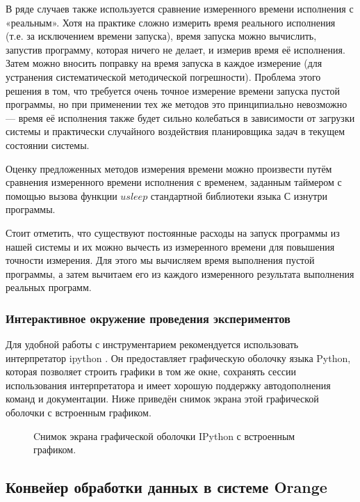 В ряде случаев также используется сравнение измеренного времени исполнения с «реальным». Хотя на практике сложно измерить время реального исполнения (т.е. за исключением времени запуска), время запуска можно вычислить, запустив программу, которая ничего не делает, и измерив время её исполнения. Затем можно вносить поправку на время запуска в каждое измерение (для устранения систематической методической погрешности). Проблема этого решения в том, что требуется очень точное измерение времени запуска пустой программы, но при применении тех же методов это принципиально невозможно --- время её исполнения также будет сильно колебаться в зависимости от загрузки системы и практически случайного воздействия планировщика задач в текущем состоянии системы.

Оценку предложенных методов измерения времени можно произвести путём сравнения измеренного времени исполнения с временем, заданным таймером с помощью вызова функции $usleep$ стандартной библиотеки языка {С} изнутри программы.

Стоит отметить, что существуют постоянные расходы на запуск программы из нашей системы и их можно вычесть из измеренного времени для повышения точности измерения. Для этого мы вычисляем время выполнения пустой программы, а затем вычитаем его из каждого измеренного результата выполнения реальных программ.

\subsubsection{Интерактивное окружение проведения экспериментов}
Для удобной работы с инструментарием рекомендуется использовать интерпретатор ipython \cite{ipython}. Он предоставляет графическую оболочку языка {Python}, которая позволяет строить графики в том же окне, сохранять сессии использования интерпретатора и имеет хорошую поддержку автодополнения команд и документации. Ниже приведён снимок экрана этой графической оболочки с встроенным графиком.

\begin{figure}[H]
    \caption{Cнимок экрана графической оболочки IPython с встроенным графиком.}
\end{figure}

\subsection{Конвейер обработки данных в системе Orange}
\label{orange-pipeline}

